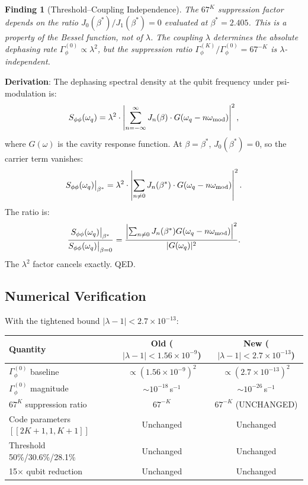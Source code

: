\documentclass[11pt]{article}
\newtheorem{finding}[theorem]{Finding}
\theoremstyle{definition}
\theoremstyle{remark}
\newcommand{\ee}[1]{\times 10^{#1}}
\newcommand{\lamdiff}{|\lambda-1|}
\begin{document}
\begin{finding}[Threshold--Coupling Independence]
\label{thm:independence}
The $67^K$ suppression factor depends on the ratio
$J_0(\beta^*)/J_1(\beta^*) = 0$ evaluated at $\beta^* = 2.405$. This
is a property of the Bessel function, not of $\lambda$. The coupling
$\lambda$ determines the \emph{absolute} dephasing rate
$\Gamma_\phi^{(0)} \propto \lambda^2$, but the \emph{suppression ratio}
$\Gamma_\phi^{(K)}/\Gamma_\phi^{(0)} = 67^{-K}$ is $\lambda$-independent.
\end{finding}

\textbf{Derivation}: The dephasing spectral density at the qubit
frequency under psi-modulation is:
\begin{equation}
S_{\phi\phi}(\omega_q) = \lambda^2 \cdot
  \left|\sum_{n=-\infty}^{\infty} J_n(\beta) \cdot
  G(\omega_q - n\omega_{\rm mod})\right|^2,
\end{equation}
where $G(\omega)$ is the cavity response function. At $\beta = \beta^*$,
$J_0(\beta^*) = 0$, so the carrier term vanishes:
\begin{equation}
S_{\phi\phi}(\omega_q)\big|_{\beta^*} = \lambda^2 \cdot
  \left|\sum_{n \neq 0} J_n(\beta^*) \cdot
  G(\omega_q - n\omega_{\rm mod})\right|^2.
\end{equation}
The ratio is:
\begin{equation}
\frac{S_{\phi\phi}(\omega_q)\big|_{\beta^*}}
     {S_{\phi\phi}(\omega_q)\big|_{\beta=0}}
= \frac{\left|\sum_{n \neq 0} J_n(\beta^*) G(\omega_q - n\omega_{\rm mod})\right|^2}
       {|G(\omega_q)|^2}.
\end{equation}
The $\lambda^2$ factor cancels exactly. QED.

\subsection{Numerical Verification}

With the tightened bound $\lamdiff < 2.7\ee{-13}$:

\begin{center}
\begin{tabular}{@{}lcc@{}}
\toprule
\textbf{Quantity} & \textbf{Old ($\lamdiff < 1.56\ee{-9}$)} &
  \textbf{New ($\lamdiff < 2.7\ee{-13}$)} \\
\midrule
$\Gamma_\phi^{(0)}$ baseline & $\propto (1.56\ee{-9})^2$ &
  $\propto (2.7\ee{-13})^2$ \\
$\Gamma_\phi^{(0)}$ magnitude & $\sim 10^{-18}$\,s$^{-1}$ &
  $\sim 10^{-26}$\,s$^{-1}$ \\
$67^K$ suppression ratio & $67^{-K}$ & $67^{-K}$ (UNCHANGED) \\
Code parameters $[[2K+1,1,K+1]]$ & Unchanged & Unchanged \\
Threshold 50\%/30.6\%/28.1\% & Unchanged & Unchanged \\
15$\times$ qubit reduction & Unchanged & Unchanged \\
\bottomrule
\end{tabular}
\end{center}
\end{document}
